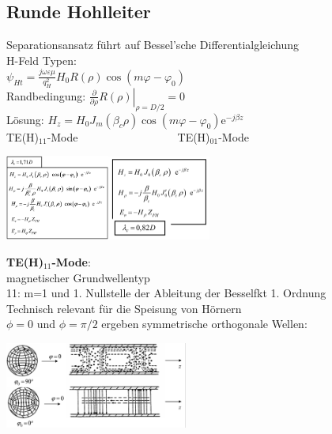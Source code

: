 \documentclass[english]{latex4ei/latex4ei_sheet}
\begin{document}
\begin{sectionbox}
	\subsection{Runde Hohlleiter}
	Separationsansatz führt auf Bessel'sche Differentialgleichung\\
	H-Feld Typen:\\
	$\psi_{H t}=\frac{j \omega \varepsilon \mu}{q_{H}^{2}} H_{0} R(\rho) \cos \left(m \varphi-\varphi_{0}\right)$\\ 
	Randbedingung: $\left.\frac{\partial}{\partial \rho} R(\rho)\right|_{\rho=D / 2}=0$\\
	Lösung: $H_{z}=H_{0} J_{m}\left(\beta_{c} \rho\right) \cos \left(m \varphi-\varphi_{0}\right) \mathrm{e}^{-j \beta z}$\\
	TE(H)$_{11}$-Mode$\quad\quad\quad\quad\quad\quad\quad\quad\quad$TE(H)$_{01}$-Mode
	\begin{center}\includegraphics[width = 3.4cm]{./img/hl-rund-h11.png}\includegraphics[width = 3.4cm]{./img/hl-rund-h01.jpeg}\end{center}
	\textbf{TE(H)$_{11}$-Mode}:\\
	magnetischer Grundwellentyp\\
	11: m=1 und 1. Nullstelle der Ableitung der Besselfkt 1. Ordnung\\
	Technisch relevant für die Speisung von Hörnern\\
	$\phi = 0$ und $\phi = \pi / 2$ ergeben symmetrische orthogonale Wellen:\\
	\begin{center}\includegraphics[width = 6cm]{./img/hl-rund-h11_2.png}\end{center}

\end{sectionbox}
\end{document}
